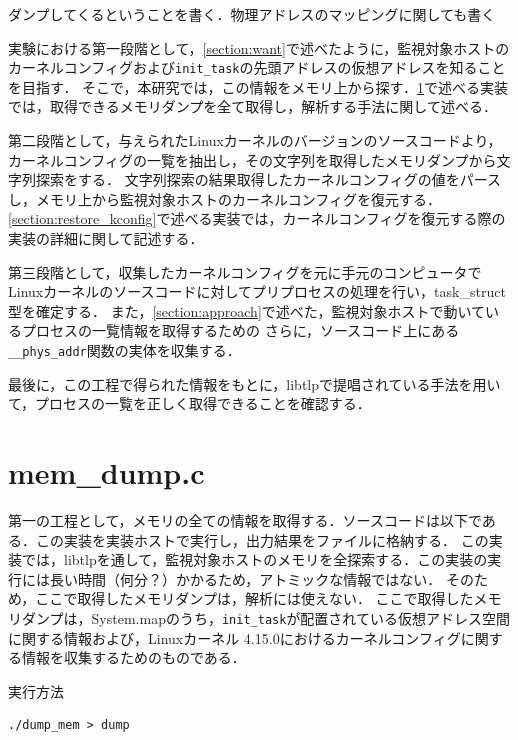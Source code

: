 ダンプしてくるということを書く．物理アドレスのマッピングに関しても書く

実験における第一段階として，\ref{section:want}で述べたように，監視対象ホストのカーネルコンフィグおよび\verb|init_task|の先頭アドレスの仮想アドレスを知ることを目指す．
そこで，本研究では，この情報をメモリ上から探す．\ref{section:mem_dump}で述べる実装では，取得できるメモリダンプを全て取得し，解析する手法に関して述べる．

第二段階として，与えられたLinuxカーネルのバージョンのソースコードより，カーネルコンフィグの一覧を抽出し，その文字列を取得したメモリダンプから文字列探索をする．
文字列探索の結果取得したカーネルコンフィグの値をパースし，メモリ上から監視対象ホストのカーネルコンフィグを復元する．
\ref{section:restore_kconfig}で述べる実装では，カーネルコンフィグを復元する際の実装の詳細に関して記述する．

第三段階として，収集したカーネルコンフィグを元に手元のコンピュータでLinuxカーネルのソースコードに対してプリプロセスの処理を行い，task\_struct型を確定する．
また，\ref{section:approach}で述べた，監視対象ホストで動いているプロセスの一覧情報を取得するための
さらに，ソースコード上にある\verb|__phys_addr|関数の実体を収集する．

最後に，この工程で得られた情報をもとに，libtlpで提唱されている手法を用いて，プロセスの一覧を正しく取得できることを確認する．

\section{mem\_dump.c}
\label{section:mem_dump}

第一の工程として，メモリの全ての情報を取得する．ソースコードは以下である．この実装を実装ホストで実行し，出力結果をファイルに格納する．
この実装では，libtlpを通して，監視対象ホストのメモリを全探索する．この実装の実行には長い時間（何分？）かかるため，アトミックな情報ではない．
そのため，ここで取得したメモリダンプは，解析には使えない．
ここで取得したメモリダンプは，System.mapのうち，\verb|init_task|が配置されている仮想アドレス空間に関する情報および，Linuxカーネル 4.15.0におけるカーネルコンフィグに関する情報を収集するためのものである．


\begin{itembox}[l]{実行方法}
    \begin{verbatim}
./dump_mem > dump
    \end{verbatim}
\end{itembox}

